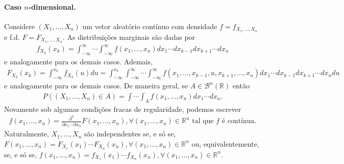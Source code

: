 \documentclass[../Notas.tex]{subfiles}
\begin{document}
\paragraph{Caso $n$-dimensional.} Considere $(X_1, \dots, X_n)$ um vetor aleatório contínuo com densidade $f = f_{X_1, \dots, X_n}$ e f.d. $F = F_{X_1, \dots, X_n}$. As distribuições marginais são dadas por
\begin{align*}
    f_{X_k}(x_k) = \int_{-\infty}^{\infty}\cdots\int_{-\infty}^{\infty} f(x_1, \dots, x_n) dx_1\cdots dx_{k-1}dx_{k+1}\cdots dx_n
\end{align*}
e analogamente para os demais casos. Ademais,
\begin{align*}
    F_{X_k}(x_k) = \int_{-\infty}^{x_k} f_{X_k}(u) du = \int_{-\infty}^{x_k}\int_{-\infty}^{\infty}\cdots\int_{-\infty}^{\infty} f(x_1, \dots, x_{k-1}, u, x_{k+1}, \dots, x_n) dx_1\cdots dx_{k-1}dx_{k+1}\cdots dx_ndu
\end{align*}
e analogamente para os demais casos. De maneira geral, se $A\in\mathcal{B}^n(\mathbb{R})$ então
\begin{align*}
    P((X_1, \dots, X_n)\in A) = \int \cdots \int_A f(x_1, \dots, x_n) dx_1\cdots dx_n.
\end{align*}
Novamente sob algumas condições fracas de regularidade, podemos escrever
\begin{align*}
    f(x_1, \dots, x_n) = \frac{\partial^n}{\partial x_1\cdots\partial x_n}F(x_1, \dots, x_n), \forall (x_1, \dots, x_n)\in\mathbb{R}^n \text{ tal que } f \text{ é contínua.}
\end{align*}
Naturalmente, $X_1, \dots, X_n$ são independentes se, e só se, $F(x_1, \dots, x_n) = F_{X_1}(x_1)\cdots F_{X_n}(x_n), \forall (x_1, \dots, x_n)\in\mathbb{R}^n$ ou, equivalentemente, se, e só se, $f(x_1, \dots, x_n) = f_{X_1}(x_1)\cdots f_{X_n}(x_n), \forall (x_1, \dots, x_n)\in\mathbb{R}^n$.
\end{document}
